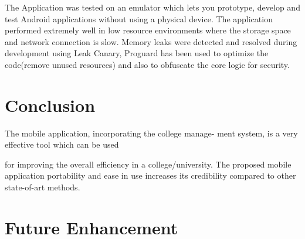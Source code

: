 \documentclass[BTech]{srmuthesis}
\begin{document}
The Application was tested on an emulator which lets you prototype, develop and test Android applications without using a physical device. The application performed extremely well in low resource environments where the storage space and network connection is slow. Memory leaks were detected and resolved during development using Leak Canary, Proguard has been used to optimize the code(remove unused resources) and also to obfuscate the core logic for security.


\chapter{Conclusion}
The mobile application, incorporating the college manage-
ment system, is a very effective tool which can be used

for improving the overall efficiency in a college/university.
The proposed mobile application portability and ease in use
increases its credibility compared to other state-of-art methods.
\chapter{Future Enhancement}



\begin{singlespace}
\end{singlespace}
\end{document}
